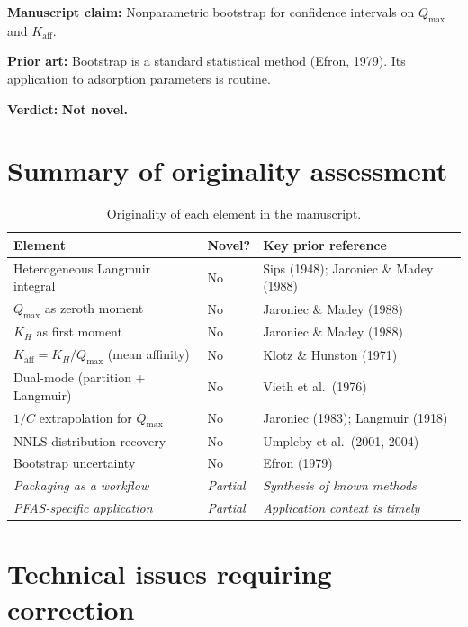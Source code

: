 \documentclass[12pt]{article}
\begin{document}
\textbf{Manuscript claim:} Nonparametric bootstrap for confidence
intervals on $Q_{\max}$ and $K_{\mathrm{aff}}$.

\textbf{Prior art:} Bootstrap is a standard statistical method (Efron,
1979).  Its application to adsorption parameters is routine.

\textbf{Verdict:} \textbf{Not novel.}

\section{Summary of originality assessment}

\begin{table}[h!]
\centering
\caption{Originality of each element in the manuscript.}
\begin{tabular}{@{}lll@{}}
\toprule
\textbf{Element} & \textbf{Novel?} & \textbf{Key prior reference} \\
\midrule
Heterogeneous Langmuir integral & No & Sips (1948); Jaroniec \& Madey (1988) \\
$Q_{\max}$ as zeroth moment     & No & Jaroniec \& Madey (1988) \\
$K_H$ as first moment           & No & Jaroniec \& Madey (1988) \\
$K_{\mathrm{aff}}=K_H/Q_{\max}$ (mean affinity)  & No & Klotz \& Hunston (1971) \\
Dual-mode (partition + Langmuir) & No & Vieth et al.\ (1976) \\
$1/C$ extrapolation for $Q_{\max}$ & No & Jaroniec (1983); Langmuir (1918) \\
NNLS distribution recovery       & No & Umpleby et al.\ (2001, 2004) \\
Bootstrap uncertainty             & No & Efron (1979) \\
\midrule
\textit{Packaging as a workflow} & \textit{Partial} &
  \textit{Synthesis of known methods} \\
\textit{PFAS-specific application} & \textit{Partial} &
  \textit{Application context is timely} \\
\bottomrule
\end{tabular}
\end{table}

\section{Technical issues requiring correction}
\end{document}
